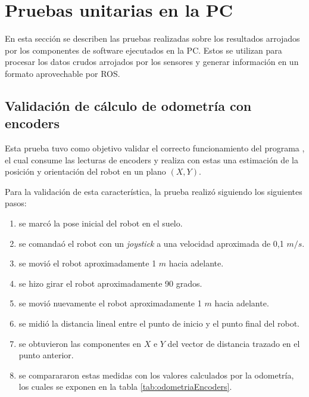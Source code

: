 \section{Pruebas unitarias en la PC}

En esta sección se describen las pruebas realizadas sobre los resultados arrojados por los componentes de software ejecutados en la PC. Estos se utilizan para procesar los datos crudos arrojados por los sensores y generar información en un formato aprovechable por ROS.

\subsection{Validación de cálculo de odometría con encoders}

Esta prueba tuvo como objetivo validar el correcto funcionamiento del programa , el cual consume las lecturas de encoders y realiza con estas una estimación de la posición y orientación del robot en un plano $(X,Y)$.

Para la validación de esta característica, la prueba realizó siguiendo los siguientes pasos:
\begin{enumerate}
    \item se marcó la pose inicial del robot en el suelo.
    \item se comandaó el robot con un \textit{joystick} a una velocidad aproximada de 0,1 $m/s$.
    \item se movió el robot aproximadamente 1 $m$ hacia adelante.
    \item se hizo girar el robot aproximadamente 90 grados.
    \item se movió nuevamente el robot aproximadamente 1 $m$ hacia adelante.
    \item se midió la distancia lineal entre el punto de inicio y el punto final del robot.
    \item se obtuvieron las componentes en $X$ e $Y$ del vector de distancia trazado en el punto anterior.
    \item se comparararon estas medidas con los valores calculados por la odometría, los cuales se exponen en la tabla \ref{tab:odometriaEncoders}.
\end{enumerate}

